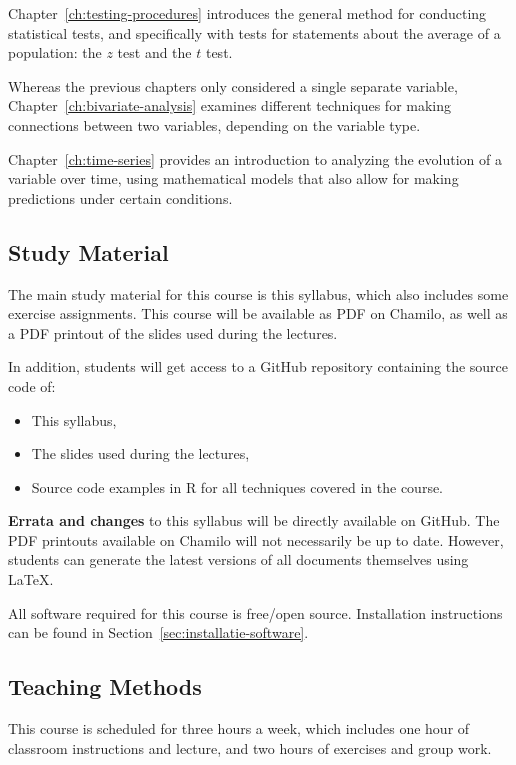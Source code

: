 Chapter~\ref{ch:testing-procedures} introduces the general method for conducting statistical tests, and specifically with tests for statements about the average of a population: the $ z $ test and the $ t $ test.

Whereas the previous chapters only considered a single separate variable, Chapter~\ref{ch:bivariate-analysis} examines different techniques for making connections between two variables, depending on the variable type.

Chapter~\ref{ch:time-series} provides an introduction to analyzing the evolution of a variable over time, using mathematical models that also allow for making predictions under certain conditions.

\subsection{Study Material}

The main study material for this course is this syllabus, which also includes some exercise assignments. 
This course will be available as PDF on Chamilo, as well as a PDF printout of the slides used during the lectures.

In addition, students will get access to a GitHub repository containing the source code of:

\begin{itemize}
    \item This syllabus,
    \item The slides used during the lectures,
    \item Source code examples in R for all techniques covered in the course.
\end{itemize}

\textbf{Errata and changes} to this syllabus will be directly available on GitHub.
The PDF printouts available on Chamilo will not necessarily be up to date.
However, students can generate the latest versions of all documents themselves using \LaTeX{}.

All software required for this course is free/open source.
Installation instructions can be found in Section~\ref{sec:installatie-software}.

\subsection{Teaching Methods}

This course is scheduled for three hours a week, which includes one hour of classroom instructions and lecture, and two hours of exercises and group work.

